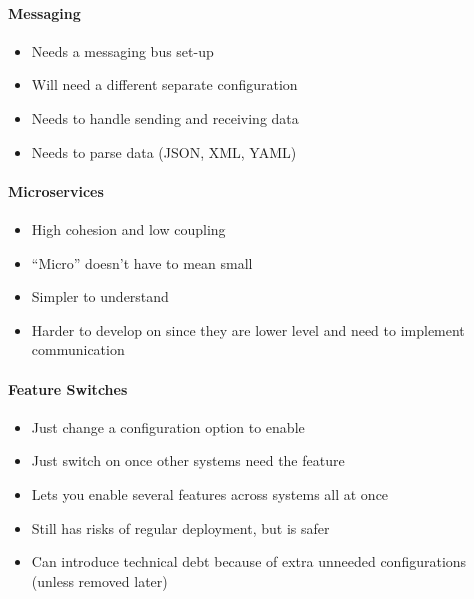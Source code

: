 \paragraph{Messaging}\label{par:messaging}

\begin{itemize}
    \item Needs a messaging bus set-up
    \item Will need a different separate configuration
    \item Needs to handle sending and receiving data
    \item Needs to parse data (JSON, XML, YAML)
\end{itemize}

\paragraph{Microservices}\label{par:microservices}

\begin{itemize}
    \item High cohesion and low coupling
    \item ``Micro'' doesn't have to mean small
    \item Simpler to understand
    \item Harder to develop on since they are lower level and need to implement communication
\end{itemize}

\paragraph{Feature Switches}\label{par:feature_switches}

\begin{itemize}
    \item Just change a configuration option to enable
    \item Just switch on once other systems need the feature
    \item Lets you enable several features across systems all at once
    \item Still has risks of regular deployment, but is safer
    \item Can introduce technical debt because of extra unneeded configurations (unless removed later)
\end{itemize}
